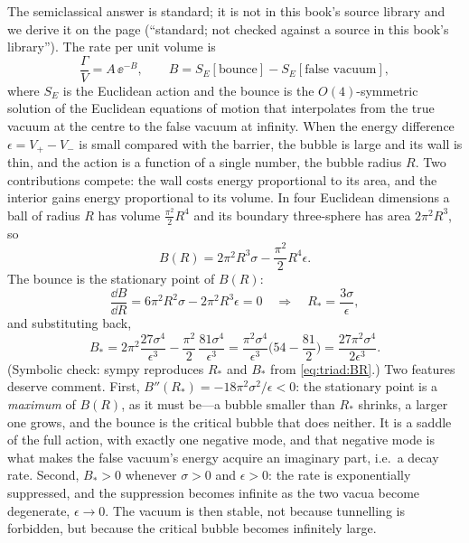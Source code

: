 The semiclassical answer is standard; it is not in this book's source library and we derive it
on the page (``standard; not checked against a source in this book's library''). The rate per
unit volume is
\begin{equation}\label{eq:triad:rate}
\frac{\Gamma}{V}=A\,\ee^{-B},\qquad B=S_E[\text{bounce}]-S_E[\text{false vacuum}],
\end{equation}
where $S_E$ is the Euclidean action and the bounce is the $O(4)$-symmetric solution of the
Euclidean equations of motion that interpolates from the true vacuum at the centre to the
false vacuum at infinity. When the energy difference $\epsilon=V_+-V_-$ is small compared with
the barrier, the bubble is large and its wall is thin, and the action is a function of a single
number, the bubble radius $R$. Two contributions compete: the wall costs energy proportional to
its area, and the interior gains energy proportional to its volume. In four Euclidean
dimensions a ball of radius $R$ has volume $\tfrac{\pi^2}{2}R^4$ and its boundary three-sphere
has area $2\pi^2R^3$, so
\begin{equation}\label{eq:triad:BR}
B(R)=2\pi^2R^3\sigma-\frac{\pi^2}{2}R^4\epsilon .
\end{equation}
The bounce is the stationary point of $B(R)$:
\begin{equation}\label{eq:triad:Rstar}
\frac{\dd B}{\dd R}=6\pi^2R^2\sigma-2\pi^2R^3\epsilon=0\quad\Longrightarrow\quad
R_*=\frac{3\sigma}{\epsilon},
\end{equation}
and substituting back,
\begin{equation}\label{eq:triad:bounce}
B_*=2\pi^2\frac{27\sigma^4}{\epsilon^3}-\frac{\pi^2}{2}\,\frac{81\sigma^4}{\epsilon^3}
=\frac{\pi^2\sigma^4}{\epsilon^3}\Big(54-\frac{81}{2}\Big)=\frac{27\pi^2\sigma^4}{2\epsilon^3}.
\end{equation}
(Symbolic check: sympy reproduces $R_*$ and $B_*$ from \eqref{eq:triad:BR}.) Two features
deserve comment. First, $B''(R_*)=-18\pi^2\sigma^2/\epsilon<0$: the stationary point is a
\emph{maximum} of $B(R)$, as it must be---a bubble smaller than $R_*$ shrinks, a larger one
grows, and the bounce is the critical bubble that does neither. It is a saddle of the full
action, with exactly one negative mode, and that negative mode is what makes the false vacuum's
energy acquire an imaginary part, i.e.\ a decay rate. Second, $B_*>0$ whenever $\sigma>0$ and
$\epsilon>0$: the rate is exponentially suppressed, and the suppression becomes infinite as the
two vacua become degenerate, $\epsilon\to0$. The vacuum is then stable, not because tunnelling
is forbidden, but because the critical bubble becomes infinitely large.

